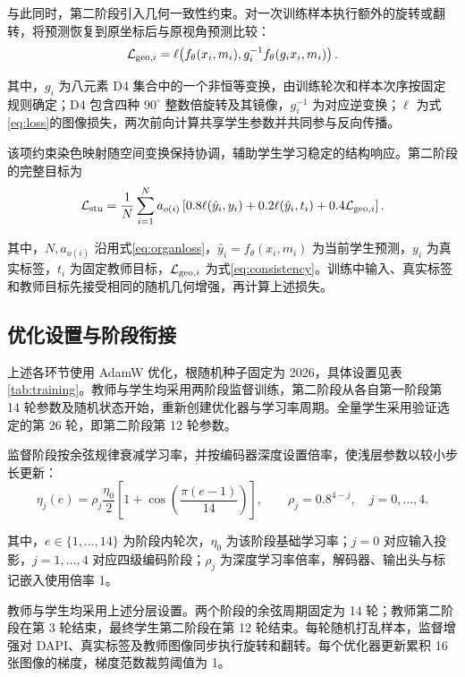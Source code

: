 \documentclass[UTF8,a4paper,zihao=5,fontset=fandol]{ctexart}
\newcommand{\sym}[1]{\par\nobreak\noindent\begin{minipage}{\linewidth}#1\end{minipage}\par}
\begin{document}
与此同时，第二阶段引入几何一致性约束。对一次训练样本执行额外的旋转或翻转，将预测恢复到原坐标后与原视角预测比较：
\begin{equation}
\mathcal L_{{\rm geo},i}=\ell\!\left(f_\theta(x_i,m_i),
g_i^{-1}f_\theta(g_ix_i,m_i)\right).
\label{eq:consistency}
\end{equation}
\sym{其中，$g_i$ 为八元素 D4 集合中的一个非恒等变换，由训练轮次和样本次序按固定规则确定；D4 包含四种 $90^\circ$ 整数倍旋转及其镜像，$g_i^{-1}$ 为对应逆变换；$\ell$ 为式\eqref{eq:loss}的图像损失，两次前向计算共享学生参数并共同参与反向传播。}
该项约束染色映射随空间变换保持协调，辅助学生学习稳定的结构响应。第二阶段的完整目标为
\begin{equation}
\mathcal L_{\rm stu}=\frac1N\sum_{i=1}^{N}a_{o(i)}
\left[0.8\ell(\hat y_i,y_i)+0.2\ell(\hat y_i,t_i)+0.4\mathcal L_{{\rm geo},i}\right].
\label{eq:student}
\end{equation}
\sym{其中，$N,a_{o(i)}$ 沿用式\eqref{eq:organloss}，$\hat y_i=f_\theta(x_i,m_i)$ 为当前学生预测，$y_i$ 为真实标签，$t_i$ 为固定教师目标，$\mathcal L_{{\rm geo},i}$ 为式\eqref{eq:consistency}。训练中输入、真实标签和教师目标先接受相同的随机几何增强，再计算上述损失。}

\subsection{优化设置与阶段衔接}
上述各环节使用 AdamW\cite{adamw} 优化，根随机种子固定为 2026，具体设置见表\ref{tab:training}。教师与学生均采用两阶段监督训练，第二阶段从各自第一阶段第 14 轮参数及随机状态开始，重新创建优化器与学习率周期。全量学生采用验证选定的第 26 轮，即第二阶段第 12 轮参数。

监督阶段按余弦规律衰减学习率\cite{sgdr}，并按编码器深度设置倍率，使浅层参数以较小步长更新：
\begin{equation}
\eta_j(e)=\rho_j\frac{\eta_0}{2}\left[1+\cos\!\left(\frac{\pi(e-1)}{14}\right)\right],
\qquad \rho_j=0.8^{4-j},\quad j=0,\ldots,4.
\label{eq:lr}
\end{equation}
\sym{其中，$e\in\{1,\ldots,14\}$ 为阶段内轮次，$\eta_0$ 为该阶段基础学习率；$j=0$ 对应输入投影，$j=1,\ldots,4$ 对应四级编码阶段；$\rho_j$ 为深度学习率倍率，解码器、输出头与标记嵌入使用倍率 1。}
教师与学生均采用上述分层设置。两个阶段的余弦周期固定为 14 轮；教师第二阶段在第 3 轮结束，最终学生第二阶段在第 12 轮结束。每轮随机打乱样本，监督增强对 DAPI、真实标签及教师图像同步执行旋转和翻转。每个优化器更新累积 16 张图像的梯度，梯度范数裁剪阈值为 1。
\end{document}
